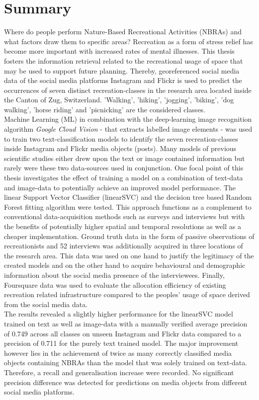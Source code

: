 \chapter*{Summary}
Where do people perform Nature-Based Recreational Activities (NBRAs) and what factors draw them to specific areas? Recreation as a form of stress relief has become more important with increased rates of mental illnesses. This thesis fosters the information retrieval related to the recreational usage of space that may be used to support future planning. Thereby, georeferenced social media data of the social media platforms Instagram and Flickr is used to predict the occurrences of seven distinct recreation-classes in the research area located inside the Canton of Zug, Switzerland. 'Walking', 'hiking', 'jogging', 'biking', 'dog walking', 'horse riding' and 'picnicking' are the considered classes. \\
Machine Learning (ML) in combination with the deep-learning image recognition algorithm \textit{Google Cloud Vision} - that extracts labelled image elements - was used to train two text-classification models to identify the seven recreation-classes inside Instagram and Flickr media objects (posts). Many models of previous scientific studies either drew upon the text or image contained information but rarely were these two data-sources used in conjunction. One focal point of this thesis investigates the effect of training a model on a combination of text-data and image-data to potentially achieve an improved model performance. The linear Support Vector Classifier (linearSVC) and the decision tree based Random Forest fitting algorithm were tested. This approach functions as a complement to conventional data-acquisition methods such as surveys and interviews but with the benefits of potentially higher spatial and temporal resolutions as well as a cheaper implementation. Ground truth data in the form of passive observations of recreationists and 52 interviews was additionally acquired in three locations of the research area. This data was used on one hand to justify the legitimacy of the created models and on the other hand to acquire behavioural and demographic information about the social media presence of the interviewees. Finally, Foursquare data was used to evaluate the allocation efficiency of existing recreation related infrastructure compared to the peoples' usage of space derived from the social media data.\\
The results revealed a slightly higher performance for the linearSVC model trained on text as well as image-data with a manually verified average precision of 0.749 across all classes on unseen Instagram and Flickr data compared to a precision of 0.711 for the purely text trained model. The major improvement however lies in the achievement of twice as many correctly classified media objects containing NBRAs than the model that was solely trained on text-data. Therefore, a recall and generalisation increase were recorded. No significant precision difference was detected for predictions on media objects from different social media platforms.
